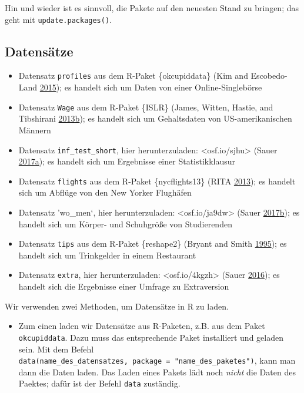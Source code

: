 \documentclass[12pt,]{book}
\providecommand{\tightlist}{%
  \setlength{\itemsep}{0pt}\setlength{\parskip}{0pt}}
\begin{document}
Hin und wieder ist es sinnvoll, die Pakete auf den neuesten Stand zu
bringen; das geht mit \texttt{update.packages()}.

\subsection{Datensätze}\label{datensatze}

\begin{itemize}
\tightlist
\item
  Datensatz \texttt{profiles} aus dem R-Paket \{okcupiddata\} (Kim and
  Escobedo-Land \protect\hyperlink{ref-kim2015okcupid}{2015}); es
  handelt sich um Daten von einer Online-Singlebörse
\item
  Datensatz \texttt{Wage} aus dem R-Paket \{ISLR\} (James, Witten,
  Hastie, and Tibshirani
  \protect\hyperlink{ref-introstatlearning}{2013}\protect\hyperlink{ref-introstatlearning}{b});
  es handelt sich um Gehaltsdaten von US-amerikanischen Männern
\item
  Datensatz \texttt{inf\_test\_short}, hier herunterzuladen:
  \textless{}osf.io/sjhu\textgreater{} (Sauer
  \protect\hyperlink{ref-Sauer_2017}{2017}\protect\hyperlink{ref-Sauer_2017}{a});
  es handelt sich um Ergebnisse einer Statistikklausur
\item
  Datensatz \texttt{flights} aus dem R-Paket \{nycflights13\} (RITA
  \protect\hyperlink{ref-nycflights13}{2013}); es handelt sich um
  Abflüge von den New Yorker Flughäfen
\item
  Datensatz 'wo\_men`, hier herunterzuladen:
  \textless{}osf.io/ja9dw\textgreater{} (Sauer
  \protect\hyperlink{ref-Sauer_2017a}{2017}\protect\hyperlink{ref-Sauer_2017a}{b});
  es handelt sich um Körper- und Schuhgröße von Studierenden
\item
  Datensatz \texttt{tips} aus dem R-Paket \{reshape2\} (Bryant and Smith
  \protect\hyperlink{ref-bryant1995practical}{1995}); es handelt sich um
  Trinkgelder in einem Restaurant
\item
  Datensatz \texttt{extra}, hier herunterzuladen:
  \textless{}osf.io/4kgzh\textgreater{} (Sauer
  \protect\hyperlink{ref-Sauer_2016}{2016}); es handelt sich die
  Ergebnisse einer Umfrage zu Extraversion
\end{itemize}

Wir verwenden zwei Methoden, um Datensätze in R zu laden.

\begin{itemize}
\tightlist
\item
  Zum einen laden wir Datensätze aus R-Paketen, z.B. aus dem Paket
  \texttt{okcupiddata}. Dazu muss das entsprechende Paket installiert
  und geladen sein. Mit dem Befehl
  \texttt{data(name\_des\_datensatzes,\ package\ =\ "name\_des\_paketes")},
  kann man dann die Daten laden. Das Laden eines Pakets lädt noch
  \emph{nicht} die Daten des Paektes; dafür ist der Befehl \texttt{data}
  zuständig.
\end{itemize}
\end{document}
